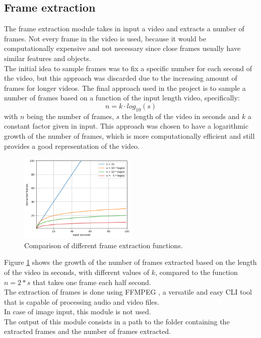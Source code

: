 \documentclass[conference]{IEEEtran}
\begin{document}
\subsection{Frame extraction}
The frame extraction module takes in input a video and extracts a number of frames. 
Not every frame in the video is used, because it would be computationally expensive and not necessary since close frames usually have similar features and objects.\\
The initial idea to sample frames was to fix a specific number for each second of the video, 
but this approach was discarded due to the increasing amount of frames for longer videos. The final approach used in the project is to sample a number of frames based on a function of the input length video, specifically:
$$n = k \cdot log_{10}(s)$$
with $n$ being the number of frames, $s$ the length of the video in seconds and $k$ a constant factor given in input. This approach was chosen to have a logarithmic growth of the number of frames, which is more computationally efficient and still provides a good representation of the video.\\
\begin{figure}[h]
    \centerline{\includegraphics[width=0.5\textwidth]{frame_extr.png}}
    \caption{Comparison of different frame extraction functions.}
    \label{frame_extraction}
\end{figure}

Figure \ref{frame_extraction} shows the growth of the number of frames extracted based on the length 
of the video in seconds, with different values of $k$, compared to the function $n = 2 * s$ that takes one frame each half second. \\
The extraction of frames is done using FFMPEG \cite{ffmpeg}, a versatile and easy CLI tool that is capable of processing audio and video files. \\
In case of image input, this module is not used. \\
The output of this module consists in a path to the folder containing the extracted frames and the number of frames extracted.
\end{document}
